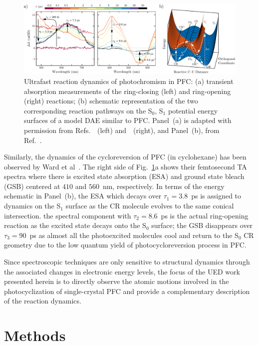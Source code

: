 \begin{figure}[t!]
  \centering
  \includegraphics[width = \textwidth]{Figures/fig_DAE_PFC_TA.pdf}
  \caption[Ultrafast reaction dynamics of photochromism.]{
    Ultrafast reaction dynamics of photochromism in PFC:
    (a) transient absorption measurements of the ring-closing (left)
    and ring-opening (right) reactions;
    (b) schematic representation of the two corresponding reaction pathways
    on the S$_0$, S$_1$ potential energy surfaces of a model DAE similar to PFC.
    Panel~(a) is adapted with permission from Refs.~\cite{Jean-Ruel2011}~(left) and~\cite{Ward2012}~(right),
    and Panel~(b), from Ref.~\cite{Boggio2003}.
  }
  \label{fig: DAE-PFC-TA}
\end{figure}

Similarly, the dynamics of the cycloreversion of PFC (in cyclohexane) has been observed
by Ward et al~\cite{Ward2012}.
The right side of Fig.~\ref{fig: DAE-PFC-TA}a shows their femtosecond TA spectra where
there is excited state absorption (ESA) and ground state bleach (GSB)
centered at $410$ and $560$~nm, respectively.
%
In terms of the energy schematic in Panel~(b), the ESA which decays over $\tau_1 = 3.8$~ps
is assigned to dynamics on the S$_1$ surface as the CR molecule evolves to the same conical intersection.
the spectral component with $\tau_2 = 8.6$~ps is the actual ring-opening reaction as the excited state
decays onto the S$_0$ surface;
the GSB disappears over $\tau_3 = 90$~ps as
almost all the photoexcited molecules cool and return to the S$_0$ CR geometry
due to the low quantum yield of photocycloreversion process in PFC.

Since spectroscopic techniques are only sensitive to structural dynamics
through the associated changes in electronic energy levels,
the focus of the UED work presented herein is to directly observe the atomic motions involved in
the photocyclization of single-crystal PFC and
provide a complementary description of the reaction dynamics.

\section{Methods}
\label{sec: UED-DAE-methods}

